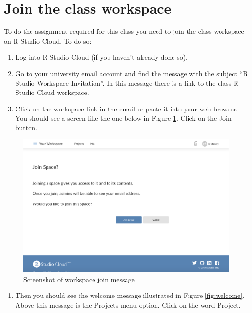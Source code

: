 \documentclass[
]{krantz}
\providecommand{\tightlist}{%
  \setlength{\itemsep}{0pt}\setlength{\parskip}{0pt}}
\begin{document}
\hypertarget{join-the-class-workspace}{%
\section{Join the class workspace}\label{join-the-class-workspace}}

To do the assignment required for this class you need to join the class workspace on R Studio Cloud. To do so:

\begin{enumerate}
\def\labelenumi{\arabic{enumi}.}
\item
  Log into R Studio Cloud (if you haven't already done so).
\item
  Go to your university email account and find the message with the subject ``R Studio Workspace Invitation''. In this message there is a link to the class R Studio Cloud workspace.
\item
  Click on the workspace link in the email or paste it into your web browser. You should see a screen like the one below in Figure \ref{fig:join}. Click on the Join button.
\end{enumerate}

\begin{figure}
\includegraphics[width=0.7\linewidth]{ch_introduction/images/screenshot_join} \caption{Screenshot of workspace join message}\label{fig:join}
\end{figure}

\begin{enumerate}
\def\labelenumi{\arabic{enumi}.}
\setcounter{enumi}{3}
\tightlist
\item
  Then you should see the welcome message illustrated in Figure \ref{fig:welcome}. Above this message is the Projects menu option. Click on the word Project.
\end{enumerate}
\end{document}
